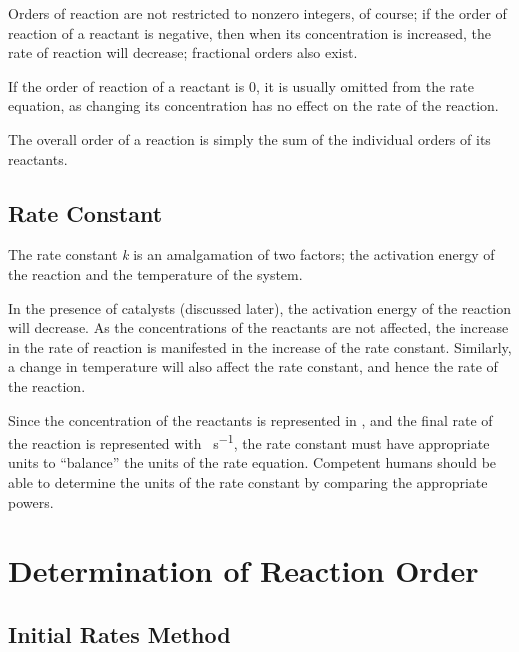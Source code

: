 			Orders of reaction are not restricted to nonzero integers, of course; if the order of reaction of a reactant is negative, then when
			its concentration is increased, the rate of reaction will decrease; fractional orders also exist.

			If the order of reaction of a reactant is 0, it is usually omitted from the rate equation, as changing its concentration has no
			effect on the rate of the reaction.

			The overall order of a reaction is simply the sum of the individual orders of its reactants.




		\subsection{Rate Constant}

			The rate constant \textit{k} is an amalgamation of two factors; the activation energy of the reaction and the temperature
			of the system.

			In the presence of catalysts (discussed later), the activation energy of the reaction will decrease. As the concentrations of the
			reactants are not affected, the increase in the rate of reaction is manifested in the increase of the rate constant. Similarly, a
			change in temperature will also affect the rate constant, and hence the rate of the reaction.

			Since the concentration of the reactants is represented in \si{\molarConc}, and the final rate of the reaction is
			represented with \si{\molarConc\per\second}, the rate constant must have appropriate units to ``balance'' the units
			of the rate equation. Competent humans should be able to determine the units of the rate constant by comparing the appropriate powers.








	\pagebreak
	\section{Determination of Reaction Order}

		\subsection{Initial Rates Method}

